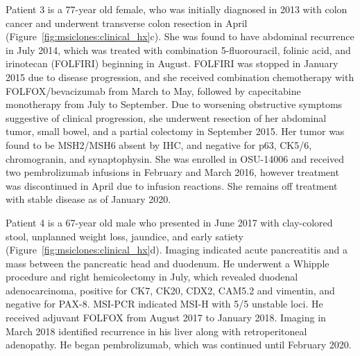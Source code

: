 Patient 3 is a 77-year old female, who was initially diagnosed in 2013 with colon cancer and underwent transverse colon resection in April (Figure~\ref{fig:msiclones:clinical_hx}c). She was found to have abdominal recurrence in July 2014, which was treated with combination 5\nobreakdash-fluorouracil, folinic acid, and irinotecan (FOLFIRI) beginning in August. FOLFIRI was stopped in January 2015 due to disease progression, and she received combination chemotherapy with FOLFOX\slash{}bevacizumab from March to May, followed by capecitabine monotherapy from July to September. Due to worsening obstructive symptoms suggestive of clinical progression, she underwent resection of her abdominal tumor, small bowel, and a partial colectomy in September 2015. Her tumor was found to be MSH2/MSH6 absent by IHC, and negative for p63, CK5/6, chromogranin, and synaptophysin. She was enrolled in OSU-14006 and received two pembrolizumab infusions in February and March 2016, however treatment was discontinued in April due to infusion reactions. She remains off treatment with stable disease as of January 2020.

Patient 4 is a 67-year old male who presented in June 2017 with clay-colored stool, unplanned weight loss, jaundice, and early satiety (Figure~\ref{fig:msiclones:clinical_hx}d). Imaging indicated acute pancreatitis and a mass between the pancreatic head and duodenum. He underwent a Whipple procedure and right hemicolectomy in July, which revealed duodenal adenocarcinoma, positive for CK7, CK20, CDX2, CAM5.2 and vimentin, and negative for PAX-8. MSI-PCR indicated MSI-H with 5/5 unstable loci. He received adjuvant FOLFOX from August 2017 to January 2018. Imaging in March 2018 identified recurrence in his liver along with retroperitoneal adenopathy. He began pembrolizumab, which was continued until February 2020.

